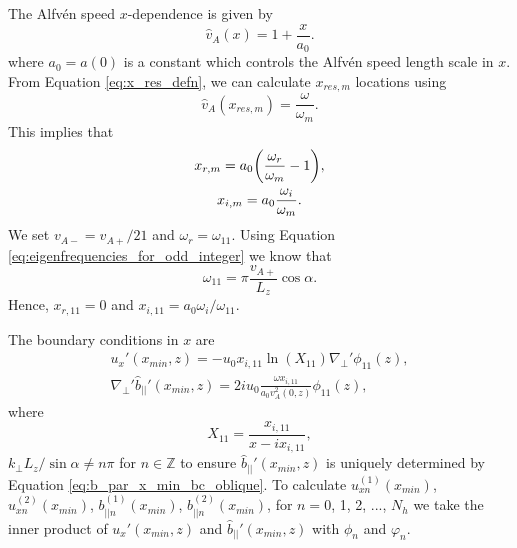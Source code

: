 The Alfv\'en speed $x$-dependence is given by
\begin{equation}
    \hat{v}_A(x)=1+\frac{x}{a_0}.
\end{equation}
where $a_0=a(0)$ is a constant which controls the Alfv\'en speed length scale in $x$. From Equation \eqref{eq:x_res_defn}, we can calculate $x_{res,m}$ locations using
\begin{equation}
    \hat{v}_A(x_{res,m}) = \frac{\omega}{\omega_m}.
\end{equation}
This implies that
\begin{gather}
    x_{r,m} = a_0\qty(\frac{\omega_r}{\omega_m}-1), \\
    x_{i,m} = a_0\frac{\omega_i}{\omega_m}.
\end{gather}
We set $v_{A-} = v_{A+} / 21$ and $\omega_r = \omega_{11}$. Using Equation \eqref{eq:eigenfrequencies_for_odd_integer} we know that
\begin{equation}
    \omega_{11} = \pi\frac{v_{A+}}{L_z}\cos\alpha.
\end{equation}
Hence, $x_{r,11}=0$ and $x_{i,11} = a_0\omega_i/\omega_{11}$.

The boundary conditions in $x$ are
\begin{gather}
    \label{eq:ux_x_min_bc_oblique}
    u_x'(x_{min},z) = -u_0x_{i,11}\ln(X_{11})\nabla_\perp'\phi_{11}(z), \\
    \label{eq:b_par_x_min_bc_oblique}
    \nabla_\perp' \hat{b}_{||}'(x_{min},z)=2iu_0\frac{\omega x_{i,11}}{a_0v_A^2(0,z)}\phi_{11}(z),
\end{gather}
where
\begin{equation}
    X_{11} = \frac{x_{i,11}}{x-ix_{i,11}},
\end{equation}
$k_\perp L_z / \sin\alpha \ne n\pi$ for $n\in\mathds{Z}$ to ensure $\hat{b}_{||}'(x_{min},z)$ is uniquely determined by Equation \eqref{eq:b_par_x_min_bc_oblique}.
To calculate $u_{xn}^{(1)}(x_{min})$, $u_{xn}^{(2)}(x_{min})$, $b_{||n}^{(1)}(x_{min})$, $b_{||n}^{(2)}(x_{min})$, for $n=0$, 1, 2, ..., $N_h$ we take the inner product of $u_x'(x_{min},z)$ and $\hat{b}_{||}'(x_{min},z)$ with $\phi_n$ and $\varphi_n$.


